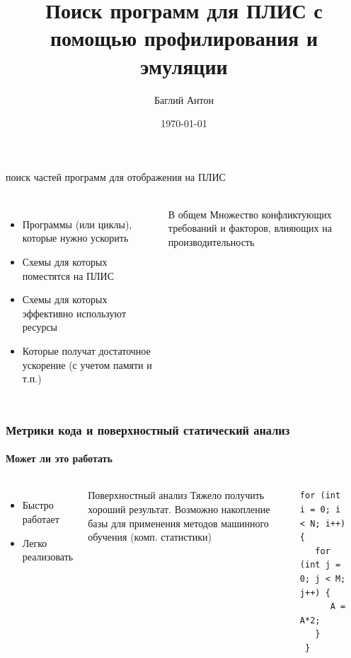 \documentclass{beamer}              %
\title{Поиск программ для ПЛИС с помощью профилирования и эмуляции}
\subtitle{}
\date{\today}
\author{Баглий Антон}
\institute{\url{sfedu.ru}}
\begin{document}
\maketitle


\begin{frame}{поиск частей программ для отображения на ПЛИС}
  \framesubtitle{}
   
  \begin{columns}
      \begin{itemize}
        \item Программы (или циклы), которые нужно ускорить
        \item Схемы для которых поместятся на ПЛИС
        \item Схемы для которых эффективно используют ресурсы
        \item Которые получат достаточное ускорение (с учетом памяти и т.п.)
      \end{itemize}

      \begin{block}{В общем}
         Множество конфликтующих требований и факторов, влияющих на производительность
      \end{block}
  \end{columns}		  
\end{frame}

\begin{frame}[fragile]
\frametitle{Метрики кода и поверхностный статический анализ}
  \framesubtitle{Может ли это работать}
  \begin{columns}
      \begin{itemize}
        \item Быстро работает
        \item Легко реализовать
      \end{itemize}
      
      \begin{block}{Поверхностный анализ}
         Тяжело получить хороший результат. Возможно накопление базы для применения методов машинного обучения (комп. статистики)
      \end{block}

      
      
\begin{lstlisting}[frame=single]
 for (int i = 0; i < N; i++) {
   for (int j = 0; j < M; j++) {
      A = A*2;
   }
 }
\end{lstlisting}
\label{clone_listing}
      
  \end{columns}
  
\end{frame}
\end{document}
